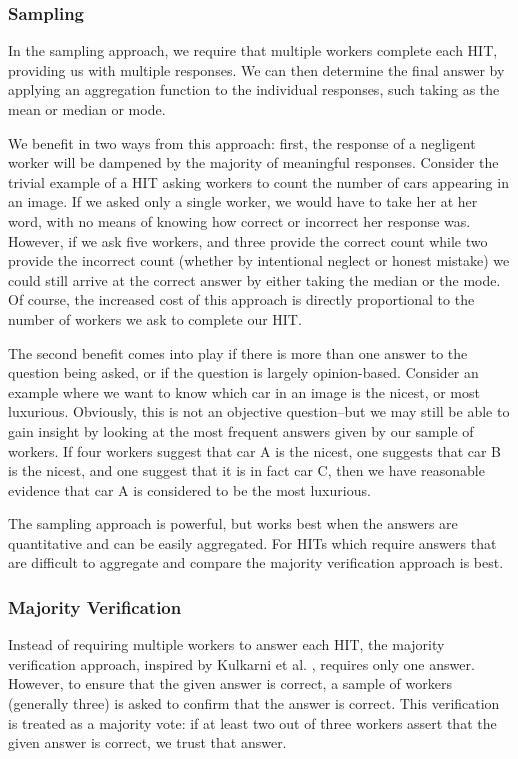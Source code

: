 \subsubsection{Sampling}

In the sampling approach, we require that multiple workers complete each HIT, providing us with multiple responses. We can then determine the final answer by applying an aggregation function to the individual responses, such taking as the mean or median or mode. 

We benefit in two ways from this approach: first, the response of a negligent worker will be dampened by the majority of meaningful responses. Consider the trivial example of a HIT asking workers to count the number of cars appearing in an image. If we asked only a single worker, we would have to take her at her word, with no means of knowing how correct or incorrect her response was. However, if we ask five workers, and three provide the correct count while two provide the incorrect count (whether by intentional neglect or honest mistake) we could still arrive at the correct answer by either taking the median or the mode. Of course, the increased cost of this approach is directly proportional to the number of workers we ask to complete our HIT.

The second benefit comes into play if there is more than one answer to the question being asked, or if the question is largely opinion-based. Consider an example where we want to know which car in an image is the nicest, or most luxurious. Obviously, this is not an objective question--but we may still be able to gain insight by looking at the most frequent answers given by our sample of workers. If four workers suggest that car A is the nicest, one suggests that car B is the nicest, and one suggest that it is in fact car C, then we have reasonable evidence that car A is considered to be the most luxurious.

The sampling approach is powerful, but works best when the answers are quantitative and can be easily aggregated. For HITs which require answers that are difficult to aggregate and compare the majority verification approach is best.

\subsubsection{Majority Verification}

Instead of requiring multiple workers to answer each HIT, the majority verification approach, inspired by Kulkarni et al. \cite{kulkarni2011turkomatic}, requires only one answer. However, to ensure that the given answer is correct, a sample of workers (generally three) is asked to confirm that the answer is correct. This verification is treated as a majority vote: if at least two out of three workers assert that the given answer is correct, we trust that answer. 


